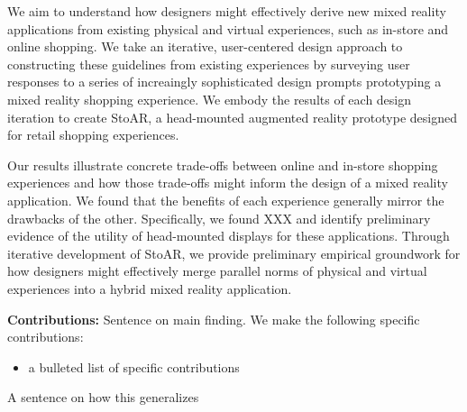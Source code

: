 
We aim to understand how designers might effectively derive new mixed reality applications from existing physical and virtual experiences, such as in-store and online shopping. 
We take an iterative, user-centered design approach to constructing these guidelines from existing experiences by surveying user responses to a series of increaingly sophisticated design prompts prototyping a mixed reality shopping experience.   We embody the results of each design iteration to create StoAR, a head-mounted augmented reality prototype designed for retail shopping experiences.

Our results illustrate concrete trade-offs between online and in-store shopping experiences and how those trade-offs might inform the design of a mixed reality application. We found that the benefits of each experience generally mirror the drawbacks of the other.  Specifically, we found XXX and identify preliminary evidence of the utility of head-mounted displays for these applications. Through iterative development of StoAR, we provide preliminary empirical groundwork for how designers might effectively merge parallel norms of physical and virtual experiences into a hybrid mixed reality application. 

\noindent\textbf{Contributions:} Sentence on main finding. We make the following specific contributions:
\begin{itemize}
	\item a bulleted list of specific contributions
\end{itemize}
A sentence on how this generalizes


